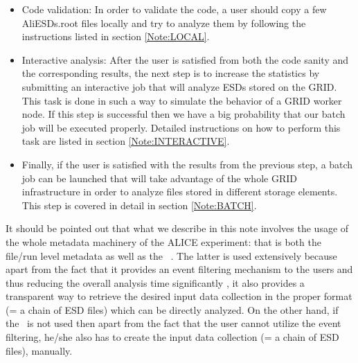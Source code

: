 \begin{itemize}
\item Code validation: In order to validate the code, a user should
  copy a few AliESDs.root files locally and try to analyze them by
  following the instructions listed in section \ref{Note:LOCAL}.

\item Interactive analysis: After the user is satisfied from both the
  code sanity and the corresponding results, the next step is to
  increase the statistics by submitting an interactive job that will
  analyze ESDs stored on the GRID. This task is done in such a way to
  simulate the behavior of a GRID worker node. If this step is
  successful then we have a big probability that our batch job will be
  executed properly. Detailed instructions on how to perform this task
  are listed in section \ref{Note:INTERACTIVE}.

\item Finally, if the user is satisfied with the results from the
  previous step, a batch job can be launched that will take advantage
  of the whole GRID infrastructure in order to analyze files stored in
  different storage elements. This step is covered in detail in
  section \ref{Note:BATCH}.

\end{itemize}

It should be pointed out that what we describe in this note involves
the usage of the whole metadata machinery of the ALICE experiment:
that is both the file/run level metadata
\cite{Note:RefFileCatalogMetadataNote} as well as the \tag\
\cite{Note:RefEventTagNote}. The latter is used extensively because
apart from the fact that it provides an event filtering mechanism to
the users and thus reducing the overall analysis time significantly
\cite{Note:RefEventTagNote}, it also provides a transparent way to
retrieve the desired input data collection in the proper format (= a
chain of ESD files) which can be directly analyzed. On the other hand,
if the \tag\ is not used then apart from the fact that the user cannot
utilize the event filtering, he/she also has to create the input data
collection (= a chain of ESD files), manually.

